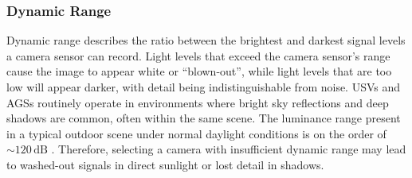 \documentclass{erauthesis}
\begin{document}

\subsubsection{Dynamic Range}
\label{dynamic_range}

Dynamic range describes the ratio between the brightest and darkest signal levels a camera sensor can record.
Light levels that exceed the camera sensor's range cause the image to appear white or ``blown-out'', while light levels that are too low will appear darker, with detail being indistinguishable from noise.
\acp{USV} and \acp{AGS} routinely operate in environments where bright sky reflections and deep shadows are common, often within the same scene.
The luminance range present in a typical outdoor scene under normal daylight conditions is on the order of $\sim\!120\,\text{dB}$ \cite{Onzon2021}.
Therefore, selecting a camera with insufficient dynamic range may lead to washed-out signals in direct sunlight or lost detail in shadows.
\end{document}
